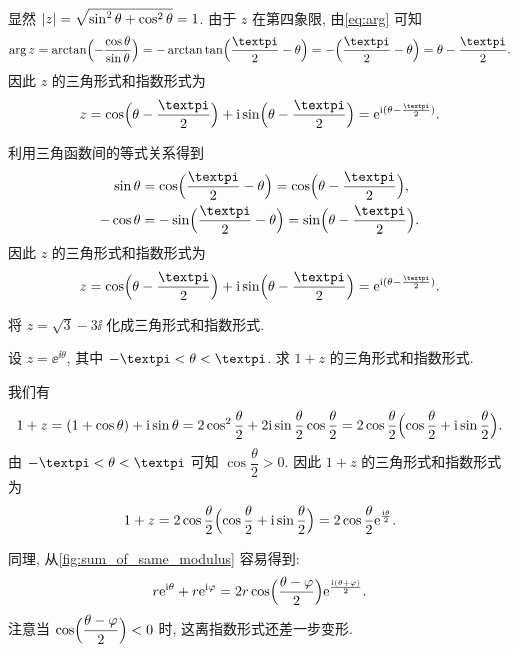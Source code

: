 \begin{solution}[解法一]
  显然 $\lvert z\rvert=\sqrt{\sin^2\theta+\cos^2\theta}=1$. 由于 $z$ 在第四象限, 由\eqref{eq:arg} 可知
  \[
     \arg z
    =\arctan\Bigl(-\frac{\cos\theta}{\sin\theta}\Bigr)
    =-\arctan\tan\Bigl(\frac\cpi2-\theta\Bigr)
    =-\Bigl(\frac\cpi2-\theta\Bigr)
    =\theta-\frac\cpi2.
  \]
  因此 $z$ 的三角形式和指数形式为
  \[
     z
    =\cos\Bigl(\theta-\frac\cpi2\Bigr)+\ii\sin\Bigl(\theta-\frac\cpi2\Bigr)
    =\ee^{\ii(\theta-\frac\cpi2)}.
  \]
\end{solution}

\begin{solution}[解法二]
  利用三角函数间的等式关系得到
  \begin{align*}
      \sin\theta
    &=\cos\Bigl(\frac\cpi2-\theta\Bigr)
     =\cos\Bigl(\theta-\frac\cpi2\Bigr),\\
      -\cos\theta
    &=-\sin\Bigl(\frac\cpi2-\theta\Bigr)
     =\sin\Bigl(\theta-\frac\cpi2\Bigr).
  \end{align*}
  因此 $z$ 的三角形式和指数形式为
  \[
     z
    =\cos\Bigl(\theta-\frac\cpi2\Bigr)+\ii\sin\Bigl(\theta-\frac\cpi2\Bigr)
    =\ee^{\ii(\theta-\frac\cpi2)}.
  \]
\end{solution}

\begin{exercise}
  将 $z=\sqrt 3-3\ii$ 化成三角形式和指数形式.
\end{exercise}

\begin{example}
  设 $z=\ee^{\ii\theta}$, 其中 $-\cpi<\theta<\cpi$.
  求 $1+z$ 的三角形式和指数形式.
\end{example}
\begin{solution}
  我们有
  \[
     1+z
    =(1+\cos\theta)+\mathrm{i}\sin\theta
    =2\cos^2\frac\theta2+2\mathrm{i}\sin\frac\theta2\cos\frac\theta2
    =2\cos\frac\theta2\Bigl(\cos\frac\theta2+\mathrm{i}\sin\frac\theta2\Bigr).
  \]
  由 $-\cpi<\theta<\cpi$ 可知 $\cos\dfrac\theta2>0$.
  因此 $1+z$ 的三角形式和指数形式为
  \[
     1+z
    =2\cos\frac\theta2\Bigl(\cos\frac\theta2+\mathrm{i}\sin\frac\theta2\Bigr)
    =2\cos\frac\theta2\mathrm{e}^{\frac{\mathrm{i}\theta}2}.
  \]
\end{solution}

同理, 从\ref{fig:sum_of_same_modulus} 容易得到:
\begin{equation}
  \label{eq:sum-of-same-modulus}
   r\mathrm{e}^{\mathrm{i}\theta}+r\mathrm{e}^{\mathrm{i}\varphi}
  =2r\cos\Bigl(\frac{\theta-\varphi}2\Bigr)\mathrm{e}^{\frac{\mathrm{i}(\theta+\varphi)}2}.
\end{equation}
注意当 $\cos\Bigl(\dfrac{\theta-\varphi}2\Bigr)<0$ 时, 这离指数形式还差一步变形.

